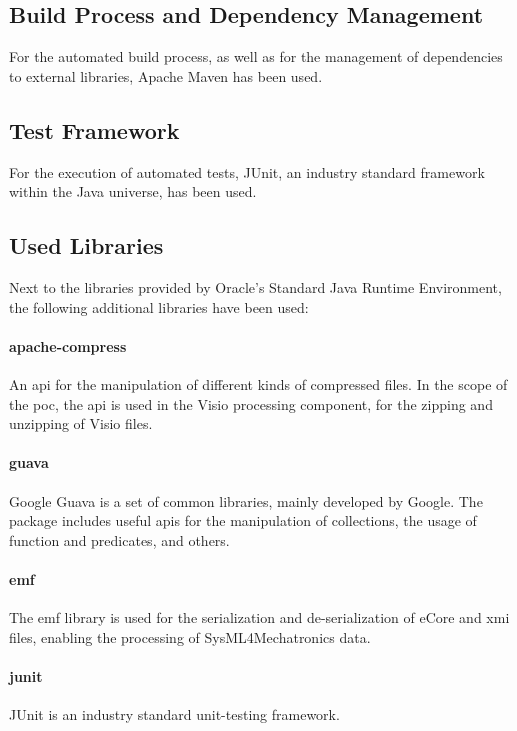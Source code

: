 \subsection{Build Process and Dependency Management}

For the automated build process, as well as for the management of dependencies to external libraries, Apache Maven\cite{ref:maven} has been used.

\subsection{Test Framework}

For the execution of automated tests, JUnit\cite{ref:junit}, an industry standard framework within the Java universe, has been used.

\subsection{Used Libraries}

Next to the libraries provided by Oracle's Standard Java Runtime Environment, the following additional libraries have been used:

\paragraph{apache-compress\cite{ref:compress}} An \gls{api} for the manipulation of different kinds of compressed files. In the scope of the \gls{poc}, the \gls{api} is used in the Visio \cite{ref:visio} processing component, for the zipping and unzipping of Visio files.

\paragraph{guava\cite{ref:guava}} Google Guava is a set of common libraries, mainly developed by Google. The package includes useful \glspl{api} for the manipulation of collections, the usage of function and predicates, and others.

\paragraph{emf\cite{ref:emf}} The \gls{emf} library is used for the serialization and de-serialization of eCore\cite{ref:emf} and \gls{xmi}\cite{ref:xmi} files, enabling the processing of SysML4Mechatronics data.

\paragraph{junit} JUnit is an industry standard unit-testing framework.

